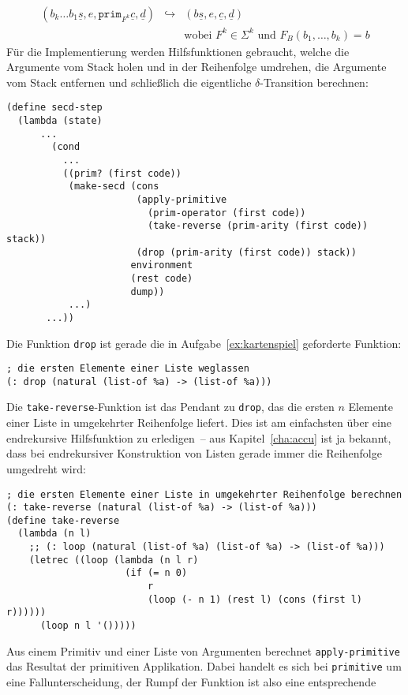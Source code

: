 %
\begin{eqnarray*}
  (b_k\ldots b_1 \underline{s}, e, \mathtt{prim}_{F^k}\underline{c}, \underline{d})
  &\hookrightarrow&
  (b\underline{s}, e, \underline{c}, \underline{d})
  \\ && \textrm{wobei $F^k\in\Sigma^k$ und $F_B(b_1,\ldots,b_k) = b$}
\end{eqnarray*}
%
Für die Implementierung werden Hilfsfunktionen gebraucht, welche die
Argumente vom Stack holen und in der Reihenfolge umdrehen, die
Argumente vom Stack entfernen und schließlich die eigentliche
$\delta$-Transition berechnen:
%
\begin{verbatim}
(define secd-step
  (lambda (state)
      ...
        (cond
          ...
          ((prim? (first code))
           (make-secd (cons
                       (apply-primitive
                         (prim-operator (first code))
                         (take-reverse (prim-arity (first code)) stack))
                       (drop (prim-arity (first code)) stack))
                      environment
                      (rest code)
                      dump))
           ...)
       ...))
\end{verbatim}
%
Die Funktion \texttt{drop} ist gerade die in
Aufgabe~\ref{ex:kartenspiel} geforderte Funktion:
%
\begin{verbatim}
; die ersten Elemente einer Liste weglassen
(: drop (natural (list-of %a) -> (list-of %a)))
\end{verbatim}
%
Die \texttt{take-reverse}-Funktion ist das Pendant zu \texttt{drop},
das die ersten $n$ Elemente einer Liste in umgekehrter Reihenfolge
liefert.  Dies ist am einfachsten über eine endrekursive Hilfsfunktion
zu erledigen~-- aus Kapitel~\ref{cha:accu} ist ja bekannt, dass bei
endrekursiver Konstruktion von Listen gerade immer die Reihenfolge
umgedreht wird:
%
\begin{verbatim}
; die ersten Elemente einer Liste in umgekehrter Reihenfolge berechnen
(: take-reverse (natural (list-of %a) -> (list-of %a)))
(define take-reverse
  (lambda (n l)
    ;; (: loop (natural (list-of %a) (list-of %a) -> (list-of %a)))
    (letrec ((loop (lambda (n l r)
                     (if (= n 0)
                         r
                         (loop (- n 1) (rest l) (cons (first l) r))))))
      (loop n l '()))))
\end{verbatim}
%
Aus einem Primitiv und einer Liste von Argumenten berechnet
\texttt{apply-primitive} das Resultat der primitiven Applikation.
Dabei handelt es sich bei \texttt{primitive} um eine
Fallunterscheidung, der Rumpf der Funktion ist also eine entsprechende
